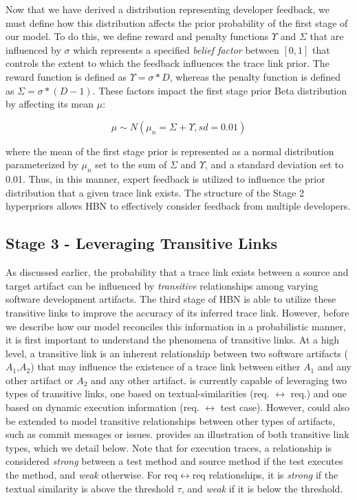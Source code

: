Now that we have derived a distribution representing developer feedback, we must define how this distribution affects the prior probability of the first stage of our model. To do this, we define reward and penalty functions $\Upsilon$ and $\Sigma$ that are influenced by $\sigma$ which represents a specified \textit{belief factor} between $[0,1]$ that controls the extent to which the feedback influences the trace link prior. The reward function is defined as $\Upsilon = \sigma*D$, whereas the penalty function is defined as $\Sigma = \sigma*(D-1)$. These factors impact the first stage prior Beta distribution by affecting its mean $\mu$:

\begin{equation}\label{eq:mean-affect}
	\mu \sim N(\mu_n= \Sigma + \Upsilon, sd=0.01)
\end{equation}

\noindent where the mean of the first stage prior is represented as a normal distribution parameterized by $\mu_n$ set to the sum of $\Sigma$ and $\Upsilon$, and a standard deviation set to 0.01. Thus, in this manner, expert feedback is utilized to influence the prior distribution that a given trace link exists. The structure of the Stage 2 hyperpriors allows \Comets HBN to effectively consider feedback from multiple developers.

\subsection{Stage 3 - Leveraging Transitive Links}
\label{sec:model-comp3}

As discussed earlier, the probability that a trace link exists between a source and target artifact can be influenced by \textit{transitive} relationships among varying software development artifacts.  The third stage of \Comets HBN is able to utilize these transitive links to improve the accuracy of its inferred trace link. However, before we describe how our model reconciles this information in a probabilistic manner, it is first important to understand the phenomena of transitive links. At a high level, a transitive link is an inherent relationship between two software artifacts ($A_1$,$A_2$) that may influence the existence of a trace link between either $A_1$ and any other artifact or $A_2$ and any other artifact. \Comet is currently capable of leveraging two types of transitive links, one based on textual-similarities (req. $\leftrightarrow$ req.) and one based on dynamic execution information (req. $\leftrightarrow$ test case). However, \Comet could also be extended to model transitive relationships between other types of artifacts, such as commit messages or issues.  provides an illustration of both transitive link types, which we detail below. Note that for execution traces, a relationship is considered \textit{strong} between a test method and source method if the test executes the method, and \textit{weak} otherwise. For req$\leftrightarrow$req relationships, it is \textit{strong} if the textual similarity is above the threshold $\tau$, and \textit{weak} if it is below the threshold.

